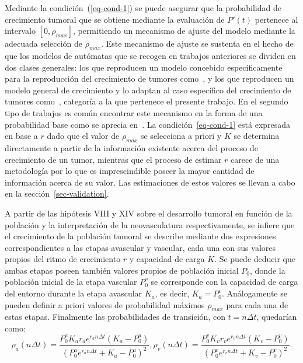 Mediante la condici\'on~(\ref{eq-cond-1}) se puede asegurar que la probabilidad de crecimiento tumoral que se obtiene mediante la evaluaci\'on de $P'(t)$ pertenece al intervalo $[0,\rho_{max}]$, permitiendo un mecanismo de ajuste del modelo mediante la adecuada selecci\'on de $\rho_{max}$. Este mecanismo de ajuste se sustenta en el hecho de que los modelos de aut\'omatas que se recogen en trabajos anteriores se dividen en dos clases generales: los que reproducen un modelo concebido espec\'ificamente para la reproducci\'on del crecimiento de tumores como~\cite{ruben}, y los que reproducen un modelo general de crecimiento y lo adaptan al caso espec\'ifico del crecimiento de tumores como~\cite{kansal,kansal3,ruanxiaoca}, categor\'ia a la que pertenece el presente trabajo. En el segundo tipo de trabajos es com\'un encontrar este mecanismo en la forma de una probabilidad base como se aprecia en~\cite{kansal}. La condici\'on~\ref{eq-cond-1} est\'a expresada en base a $r$ dado que el valor de $\rho_{max}$ se selecciona a priori y $K$ se determina directamente a partir de la informaci\'on existente acerca del proceso de crecimiento de un tumor, mientras que el proceso de estimar $r$ carece de una metodolog\'ia por lo que es imprescindible poseer la mayor cantidad de informaci\'on acerca de su valor. Las estimaciones de estos valores se llevan a cabo en la secci\'on~\ref{sec-validation}.

A partir de las hip\'otesis VIII y XIV sobre el desarrollo tumoral en funci\'on de la poblaci\'on y la interpretaci\'on de la neovasculatura respectivamente, se infiere que el crecimiento de la poblaci\'on tumoral se describe mediante dos expresiones correspondientes a las etapas avascular y vascular, cada una con sus valores propios del ritmo de crecimiento $r$ y capacidad de carga $K$. Se puede deducir que ambas etapas poseen tambi\'en valores propios de poblaci\'on inicial $P_0$, donde la poblaci\'on inicial de la etapa vascular $P_0^v$ se corresponde con la capacidad de carga del entorno durante la etapa avascular $K_a$, es decir, $K_a = P_0^v$. An\'alogamente se pueden definir a priori valores de probabilidad m\'aximos $\rho_{max}$ para cada una de estas etapas. Finalmente las probabilidades de transici\'on, con $t=n\Delta t$, quedar\'ian como:
\begin{subequations}
\begin{equation}
\rho_a(n\Delta t) = \displaystyle\frac{P_0^a K_a r_a e^{r_a n\Delta t}(K_a-P_0^a)}{(P_0^a e^{r_a n\Delta t} + K_a - P_0^a)^2},
\label{eq-pa}
\end{equation}
\begin{equation}
\rho_v(n\Delta t) = \displaystyle\frac{P_0^v K_v r_v e^{r_v n\Delta t}(K_v-P_0^v)}{(P_0^v e^{r_v n\Delta t} + K_v - P_0^v)^2}.
\label{eq-pv}
\end{equation}
\end{subequations}

